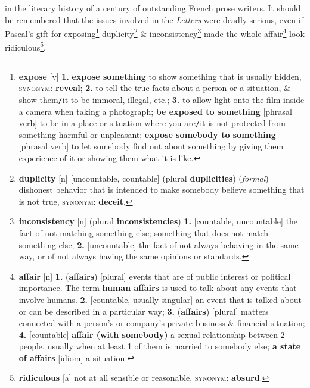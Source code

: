 \documentclass[oneside]{book}
\numberwithin{equation}{section}
\begin{document}
in the literary history of a century of outstanding French prose writers. It should be remembered that the issues involved in the \textit{Letters} were deadly serious, even if Pascal's gift for exposing\footnote{\textbf{expose} [v] \textbf{1.} \textbf{expose something} to show something that is usually hidden, \textsc{synonym}: \textbf{reveal}; \textbf{2.} to tell the true facts about a person or a situation, \& show them\texttt{/}it to be immoral, illegal, etc.; \textbf{3.} to allow light onto the film inside a camera when taking a photograph; \textbf{be exposed to something} [phrasal verb] to be in a place or situation where you are\texttt{/}it is not protected from something harmful or unpleasant; \textbf{expose somebody to something} [phrasal verb] to let somebody find out about something by giving them experience of it or showing them what it is like.} duplicity\footnote{\textbf{duplicity} [n] [uncountable, countable] (plural \textbf{duplicities}) (\textit{formal}) dishonest behavior that is intended to make somebody believe something that is not true, \textsc{synonym}: \textbf{deceit}.} \& inconsistency\footnote{\textbf{inconsistency} [n] (plural \textbf{inconsistencies}) \textbf{1.} [countable, uncountable] the fact of not matching something else; something that does not match something else; \textbf{2.} [uncountable] the fact of not always behaving in the same way, or of not always having the same opinions or standards.} made the whole affair\footnote{\textbf{affair} [n] \textbf{1.} (\textbf{affairs}) [plural] events that are of public interest or political importance. The term \textbf{human affairs} is used to talk about any events that involve humans. \textbf{2.} [countable, usually singular] an event that is talked about or can be described in a particular way; \textbf{3.} (\textbf{affairs}) [plural] matters connected with a person's or company's private business \& financial situation; \textbf{4.} [countable] \textbf{affair (with somebody)} a sexual relationship between 2 people, usually when at least 1 of them is married to somebody else; \textbf{a state of affairs} [idiom] a situation.} look ridiculous\footnote{\textbf{ridiculous} [a] not at all sensible or reasonable, \textsc{synonym}: \textbf{absurd}.}.
\end{document}
